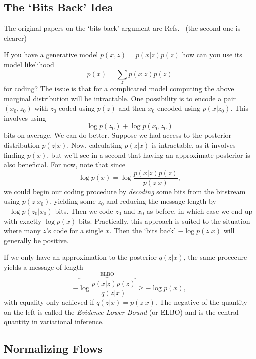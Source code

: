 \documentclass[preprint,notitlepage]{revtex4-1}
\begin{document}
\subsection{The `Bits Back' Idea}\label{sec:bits}

The original papers on the `bits back' argument are Refs.~\cite{Hinton:1994aa,Frey:1996aa} (the second one is clearer)

If you have a generative model $p(x,z)=p(x|z)p(z)$ how can you use its model likelihood
%
\begin{equation}
  p(x) = \sum_z p(x|z)p(z)
\end{equation}
%
 for coding? The issue is that for a complicated model computing the above marginal distribution will be intractable. One possibility is to encode a pair $(x_0,z_0)$ with $z_0$ coded using $p(z)$ and then $x_0$ encoded using $p(x|z_0)$. This involves using
 \begin{equation}
   \log p(z_0) + \log p(x_0|z_0)
 \end{equation}
%
bits on average. We can do better. Suppose we had access to the posterior distribution $p(z|x)$. Now, calculating $p(z|x)$ is intractable, as it involves finding $p(x)$, but we'll see in a second that having an approximate posterior is also beneficial. For now, note that since
%
\begin{equation}
  \log p(x) = \log \frac{p(x|z)p(z)}{p(z|x)},
\end{equation}
%
we could begin our coding procedure by \emph{decoding} some bits from the bitstream using $p(z|x_0)$, yielding some $z_0$ and reducing the message length by $-\log p(z_0|x_0)$ bits. Then we code $z_0$ and $x_0$ as before, in which case we end up with exactly $\log p(x)$ bits. Practically, this approach is suited to the situation where many $z$'s code for a single $x$. Then the `bits back' $-\log p(z|x)$ will generally be positive.

If we only have an approximation to the posterior $q(z|x)$, the same procecure yields a message of length
%
\begin{equation}
  -\overbrace{\log \frac{p(x|z)p(z)}{q(z|x)}}^{\text{ELBO}}\geq -\log p(x),
\end{equation}
%
with equality only achieved if $q(z|x)=p(z|x)$. The negative of the quantity on the left is called the \emph{Evidence Lower Bound} (or ELBO) and is the central quantity in variational inference.

\subsection{Normalizing Flows}
\end{document}
